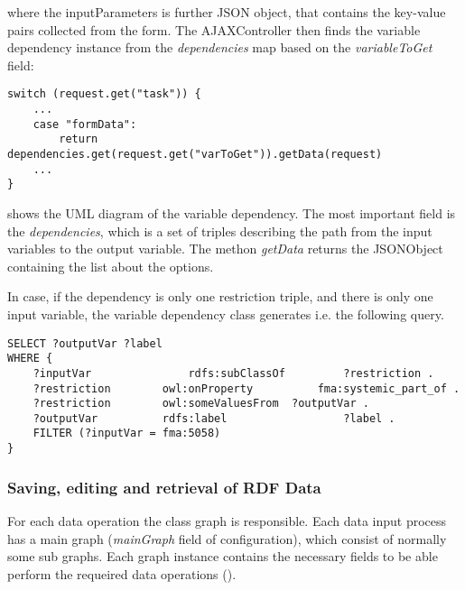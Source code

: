 where the inputParameters is further JSON object, that contains the key-value pairs collected from the form. The AJAXController then finds the variable dependency instance from the \textit{dependencies} map based on the \textit{variableToGet} field:

\begin{lstlisting}[basicstyle=\footnotesize, frame=single, caption={Loading form data from FormConfiguration}, label=serveRequest, captionpos=b, belowskip=1em, aboveskip=2em]
switch (request.get("task")) {
	...
	case "formData": 
		return dependencies.get(request.get("varToGet")).getData(request)
	...		
}
\end{lstlisting}

 shows the UML diagram of the variable dependency. The most important field is the \textit{dependencies}, which is a set of triples describing the path from the input variables to the output variable. The methon \textit{getData} returns the JSONObject containing the list about the options.


In case, if the dependency is only one restriction triple, and there is only one input variable, the variable dependency class generates i.e. the following query.

\begin{lstlisting}[basicstyle=\footnotesize, frame=single, caption={SPARQL query generated by class restriction triple}, label=JS_subFormRoutine, captionpos=b, belowskip=1em, aboveskip=2em]
SELECT ?outputVar ?label 
WHERE {
	?inputVar				rdfs:subClassOf			?restriction .
	?restriction		owl:onProperty			fma:systemic_part_of .
	?restriction		owl:someValuesFrom	?outputVar .
	?outputVar			rdfs:label					?label .	
	FILTER (?inputVar = fma:5058)
}
\end{lstlisting}


\newpage
\subsubsection{Saving, editing and retrieval of RDF Data}

For each data operation the class graph is responsible. Each data input process has a main graph (\textit{mainGraph} field of configuration), which consist of normally some sub graphs. Each graph instance contains the necessary fields to be able perform the requeired data operations (). 


